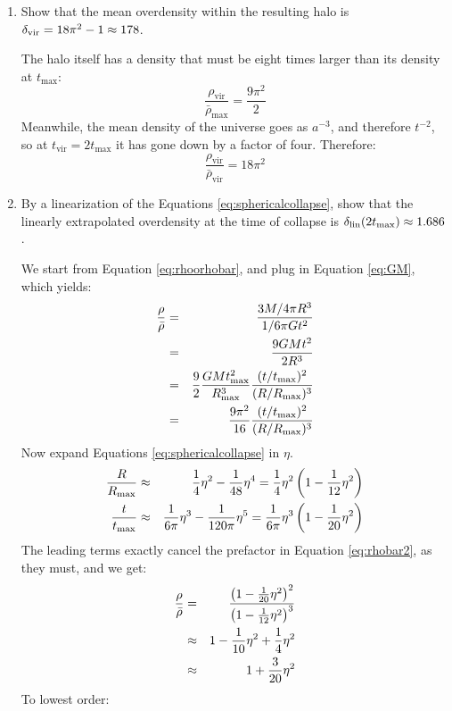 \begin{enumerate}
\begin{enumerate}
\item Show that the mean overdensity within the resulting halo  is
$\delta_{\rm vir} = 18\pi^2 - 1\approx 178$. 
\begin{answer}
The halo itself has a density that must be eight times larger than its
density at $t_\text{max}$:
\begin{equation}
\frac{\rho_\text{vir}}{\bar\rho_\text{max}} = \frac{9\pi^2}{2}
\end{equation}
Meanwhile, the mean density of the universe goes as $a^{-3}$, and
therefore $t^{-2}$, so at $t_\text{vir} = 2 t_\text{max}$ it has gone
down by a factor of four. Therefore:
\begin{equation}
\frac{\rho_\text{vir}}{\bar\rho_\text{vir}} = 18\pi^2
\end{equation}
\end{answer}
\item By a linearization of the Equations \ref{eq:sphericalcollapse}, show
that the linearly extrapolated overdensity at the time of collapse is
$\delta_{\rm lin}(2 t_{\rm max}) \approx 1.686$.
\begin{answer}
We start from Equation \ref{eq:rhoorhobar},
and plug in Equation \ref{eq:GM}, which yields:
\begin{eqnarray}
\label{eq:rhobar2}
\frac{\rho}{\bar\rho} &=& \frac{3M / 4\pi R^3}{1 / 6\pi G t^2} \cr
&=& \frac{9 GM t^2}{2 R^3} \cr
&=& \frac{9}{2} \frac{GM
t_\text{max}^2}{R_\text{max}^3} \frac{(t/t_\text{max})^2}{(R/R_\text{max})^3}\cr
&=& \frac{9\pi^2}{16} \frac{(t/t_\text{max})^2}{(R/R_\text{max})^3}
\end{eqnarray}
Now expand Equations \ref{eq:sphericalcollapse} in $\eta$. 
\begin{eqnarray}
\frac{R}{R_\text{max}} &\approx& \frac{1}{4} \eta^2
- \frac{1}{48} \eta^4 = \frac{1}{4}\eta^2
\left(1 - \frac{1}{12} \eta^2\right)\cr
\frac{t}{t_\text{max}} &\approx& \frac{1}{6\pi} \eta^3
- \frac{1}{120 \pi} \eta^5 = \frac{1}{6\pi} \eta^3
\left(1 - \frac{1}{20} \eta^2\right)
\end{eqnarray}
The leading terms exactly cancel the prefactor in
Equation \ref{eq:rhobar2}, as they must, and we get:
\begin{eqnarray}
\frac{\rho}{\bar\rho} &=&  \frac{\left(1
- \frac{1}{20}\eta^2\right)^2}
{\left(1 - \frac{1}{12} \eta^2\right)^3} \cr
&\approx& 1 - \frac{1}{10}\eta^2 + \frac{1}{4} \eta^2 \cr
&\approx& 1 + \frac{3}{20}\eta^2
\end{eqnarray}
To lowest order:
\begin{equation}

\end{equation}
\end{answer}
\end{enumerate}
\end{enumerate}
